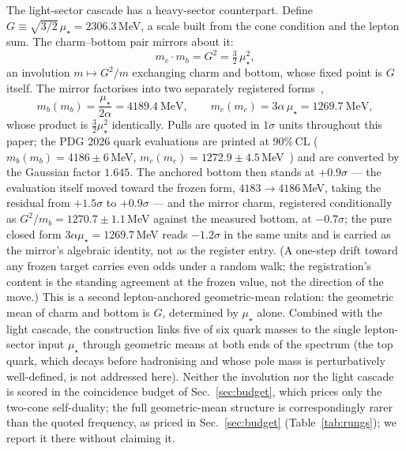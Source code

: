 \documentclass[11pt]{article}
\begin{document}
The light-sector cascade has a heavy-sector counterpart. Define
$G \equiv \sqrt{3/2}\,\mu_\star = 2306.3$\,MeV, a scale built from the cone
condition and the lepton sum. The charm--bottom pair mirrors about it:
\begin{equation}
m_c \cdot m_b = G^2 = \tfrac{3}{2}\,\mu_\star^2,
\label{eq:involution}
\end{equation}
an involution $m \mapsto G^2/m$ exchanging charm and bottom, whose fixed
point is $G$ itself. The mirror factorises into two separately registered
forms~\cite{Prereg},
\begin{equation}
m_b(m_b) = \frac{\mu_\star}{2\alpha} = 4189.4\ \mathrm{MeV},
\qquad
m_c(m_c) = 3\alpha\,\mu_\star = 1269.7\ \mathrm{MeV},
\label{eq:anchoredb}
\end{equation}
whose product is $\tfrac{3}{2}\mu_\star^2$ identically. Pulls are quoted in
$1\sigma$ units throughout this paper; the PDG 2026 quark evaluations are
printed at $90\%$\,CL ($m_b(m_b) = 4186\pm6$\,MeV,
$m_c(m_c) = 1272.9\pm4.5$\,MeV~\cite{PDG}) and are converted by the Gaussian
factor $1.645$. The anchored bottom then stands at $+0.9\sigma$ --- the
evaluation itself moved toward the frozen form, $4183 \to 4186$\,MeV, taking
the residual from $+1.5\sigma$ to $+0.9\sigma$ --- and the mirror charm,
registered conditionally as $G^2/m_b = 1270.7\pm1.1$\,MeV against the
measured bottom, at $-0.7\sigma$; the pure closed form
$3\alpha\mu_\star = 1269.7$\,MeV reads $-1.2\sigma$ in the same units and is
carried as the mirror's algebraic identity, not as the register entry. (A
one-step drift toward any frozen target carries even odds under a random
walk; the registration's content is the standing agreement at the frozen
value, not the direction of the move.) This is a second
lepton-anchored geometric-mean relation: the geometric mean of charm and
bottom is $G$, determined by $\mu_\star$ alone. Combined with the light
cascade, the construction links five of six quark masses to the single
lepton-sector input $\mu_\star$ through geometric means at both ends of the
spectrum (the top quark, which decays before hadronising and whose pole mass
is perturbatively well-defined, is not addressed here). Neither the
involution nor the light cascade is scored in the coincidence budget of
Sec.~\ref{sec:budget}, which prices only the two-cone self-duality; the
full geometric-mean structure is correspondingly rarer than the quoted
frequency, as priced in Sec.~\ref{sec:budget} (Table~\ref{tab:rungs}); we
report it there without claiming it.
\end{document}
